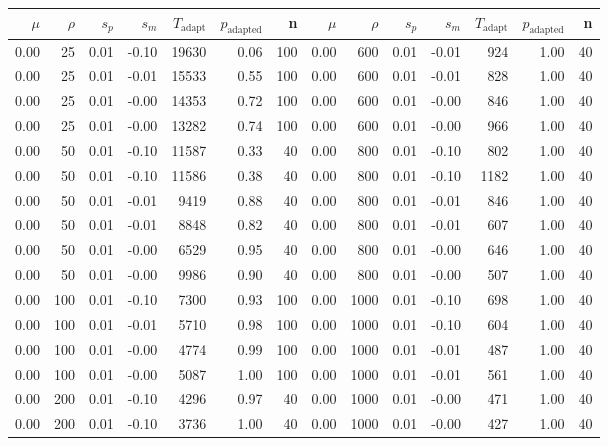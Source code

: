 \begin{table}[ht]
\centering
{\tiny
\begin{tabular}{|rrrrrrr||rrrrrrr|}
  \hline
$\mu$ & $\rho$ & $s_p$ & $s_m$ & $T_\text{adapt}$ & $p_\text{adapted}$ & n & $\mu$ & $\rho$ & $s_p$ & $s_m$ & $T_\text{adapt}$ & $p_\text{adapted}$ & n \\ 
  \hline
0.00 & 25 & 0.01 & -0.10 & 19630 & 0.06 & 100 & 0.00 & 600 & 0.01 & -0.01 & 924 & 1.00 & 40 \\ 
  0.00 & 25 & 0.01 & -0.01 & 15533 & 0.55 & 100 & 0.00 & 600 & 0.01 & -0.01 & 828 & 1.00 & 40 \\ 
  0.00 & 25 & 0.01 & -0.00 & 14353 & 0.72 & 100 & 0.00 & 600 & 0.01 & -0.00 & 846 & 1.00 & 40 \\ 
  0.00 & 25 & 0.01 & -0.00 & 13282 & 0.74 & 100 & 0.00 & 600 & 0.01 & -0.00 & 966 & 1.00 & 40 \\ 
  0.00 & 50 & 0.01 & -0.10 & 11587 & 0.33 & 40 & 0.00 & 800 & 0.01 & -0.10 & 802 & 1.00 & 40 \\ 
  0.00 & 50 & 0.01 & -0.10 & 11586 & 0.38 & 40 & 0.00 & 800 & 0.01 & -0.10 & 1182 & 1.00 & 40 \\ 
  0.00 & 50 & 0.01 & -0.01 & 9419 & 0.88 & 40 & 0.00 & 800 & 0.01 & -0.01 & 846 & 1.00 & 40 \\ 
  0.00 & 50 & 0.01 & -0.01 & 8848 & 0.82 & 40 & 0.00 & 800 & 0.01 & -0.01 & 607 & 1.00 & 40 \\ 
  0.00 & 50 & 0.01 & -0.00 & 6529 & 0.95 & 40 & 0.00 & 800 & 0.01 & -0.00 & 646 & 1.00 & 40 \\ 
  0.00 & 50 & 0.01 & -0.00 & 9986 & 0.90 & 40 & 0.00 & 800 & 0.01 & -0.00 & 507 & 1.00 & 40 \\ 
  0.00 & 100 & 0.01 & -0.10 & 7300 & 0.93 & 100 & 0.00 & 1000 & 0.01 & -0.10 & 698 & 1.00 & 40 \\ 
  0.00 & 100 & 0.01 & -0.01 & 5710 & 0.98 & 100 & 0.00 & 1000 & 0.01 & -0.10 & 604 & 1.00 & 40 \\ 
  0.00 & 100 & 0.01 & -0.00 & 4774 & 0.99 & 100 & 0.00 & 1000 & 0.01 & -0.01 & 487 & 1.00 & 40 \\ 
  0.00 & 100 & 0.01 & -0.00 & 5087 & 1.00 & 100 & 0.00 & 1000 & 0.01 & -0.01 & 561 & 1.00 & 40 \\ 
  0.00 & 200 & 0.01 & -0.10 & 4296 & 0.97 & 40 & 0.00 & 1000 & 0.01 & -0.00 & 471 & 1.00 & 40 \\ 
  0.00 & 200 & 0.01 & -0.10 & 3736 & 1.00 & 40 & 0.00 & 1000 & 0.01 & -0.00 & 427 & 1.00 & 40 \\ 

\end{tabular}}
\end{table}
